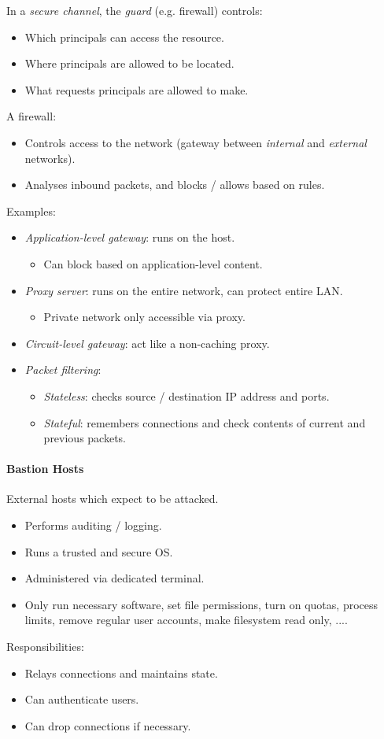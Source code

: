 \documentclass[twocolumn,english]{article}
\begin{document}
In a \emph{secure channel}, the \emph{guard} (e.g. firewall) controls:
\begin{itemize}
\item Which principals can access the resource.
\item Where principals are allowed to be located.
\item What requests principals are allowed to make.
\end{itemize}
A firewall:
\begin{itemize}
\item Controls access to the network (gateway between \emph{internal} and
\emph{external} networks).
\item Analyses inbound packets, and blocks / allows based on rules.
\end{itemize}
Examples:
\begin{itemize}
\item \emph{Application-level gateway}: runs on the host.
\begin{itemize}
\item Can block based on application-level content.
\end{itemize}
\item \emph{Proxy server}: runs on the entire network, can protect entire
LAN.
\begin{itemize}
\item Private network only accessible via proxy.
\end{itemize}
\item \emph{Circuit-level gateway}: act like a non-caching proxy.
\item \emph{Packet filtering}:
\begin{itemize}
\item \emph{Stateless}: checks source / destination IP address and ports.
\item \emph{Stateful}: remembers connections and check contents of current
and previous packets.
\end{itemize}
\end{itemize}

\paragraph{Bastion Hosts}

External hosts which expect to be attacked.
\begin{itemize}
\item Performs auditing / logging.
\item Runs a trusted and secure OS.
\item Administered via dedicated terminal.
\item Only run necessary software, set file permissions, turn on quotas,
process limits, remove regular user accounts, make filesystem read
only, ....
\end{itemize}
Responsibilities:
\begin{itemize}
\item Relays connections and maintains state.
\item Can authenticate users.
\item Can drop connections if necessary.
\end{itemize}
\end{document}
